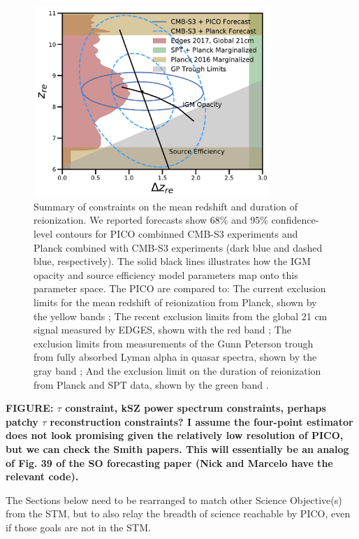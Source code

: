\documentclass[PICOReport.tex]{subfiles}
\begin{document}
\begin{figure}
\includegraphics[width=0.8\textwidth]{images/Reionization_Contours_zbar_delz_PICO_NEW.pdf}
\caption{\label{fig:ReionizationPICO} Summary of constraints on the mean redshift and duration of reionization. We reported forecasts show 68\% and 95\% confidence-level contours for PICO combinned CMB-S3 experiments and Planck combined with CMB-S3 experiments (dark blue and dashed blue, respectively). The solid black lines illustrates how the IGM opacity and source efficiency model parameters map onto this parameter space. The PICO are compared to: The current exclusion limits for the mean redshift of reionization from Planck, shown by the yellow bands \citealp{planck2018:parameters}; The recent exclusion limits from the global 21 cm signal measured by EDGES, shown with the red band \citealp{edges2017}; The exclusion limits from measurements of the Gunn Peterson trough from fully absorbed Lyman alpha in quasar spectra, shown by the gray band \citealp{Fan2006}; And the exclusion limit on the duration of reionization from Planck and SPT data, shown by the green band \citealp{planck_reio:2016}.}
\end{figure}

\textbf{FIGURE: $\tau$ constraint, kSZ power spectrum constraints, perhaps patchy $\tau$ reconstruction constraints? I assume the four-point estimator does not look promising given the relatively low resolution of PICO, but we can check the Smith papers.  This will essentially be an analog of Fig. 39 of the SO forecasting paper (Nick and Marcelo have the relevant code).}


The Sections below need to be rearranged to match other Science Objective(s) from the STM, but to also relay the 
breadth of science reachable by PICO, even if those goals are not in the STM. 
\end{document}
